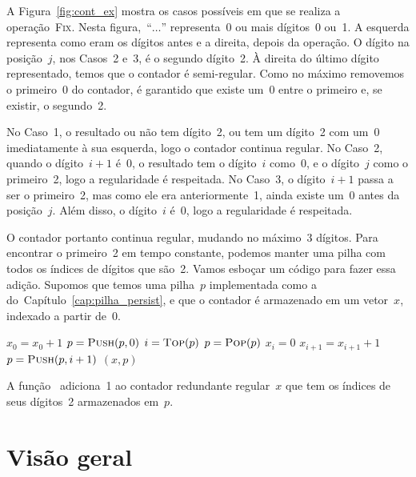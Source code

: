 \documentclass[main.tex]{subfiles}
\begin{document}
A Figura~\ref{fig:cont_ex} mostra os casos possíveis em que se realiza a operação~\textsc{Fix}. Nesta figura,~``$\ldots$'' representa~0 ou mais dígitos~0 ou~1. A esquerda representa como eram os dígitos antes e a direita, depois da operação. O dígito na posição~$j$, nos Casos~2 e~3, é o segundo dígito~2. À direita do último dígito representado, temos que o contador é semi-regular. Como no máximo removemos o primeiro~0 do contador, é garantido que existe um~0 entre o primeiro e, se existir, o segundo~2.

No Caso~1, o resultado ou não tem dígito~2, ou tem um dígito~2 com um~0 imediatamente à sua esquerda, logo o contador continua regular. No Caso~2, quando o dígito~$i + 1$ é~0, o resultado tem o dígito~$i$ como~0, e o dígito~$j$ como o primeiro~2, logo a regularidade é respeitada. No Caso~3, o dígito~$i+1$ passa a ser o primeiro~2, mas como ele era anteriormente~1, ainda existe um~0 antes da posição~$j$. Além disso, o dígito~$i$ é~0, logo a regularidade é respeitada.

O contador portanto continua regular, mudando no máximo~3 dígitos. Para encontrar o primeiro~2 em tempo constante, podemos manter uma pilha com todos os índices de dígitos que são~2. Vamos esboçar um código para fazer essa adição. Supomos que temos uma pilha~$p$ implementada como a do~Capítulo~\ref{cap:pilha_persist}, e que o contador é armazenado em um vetor~$x$, indexado a partir de~0.

\begin{algorithm}
\begin{algorithmic}[1]

    \State $x_0 = x_0 + 1$
        \State $p = \Call{Push}{p, 0}$
    \EndIf
     
        \State $i = \Call{Top}{p}$
        \State $p = \Call{Pop}{p}$
        \State $x_i = 0$
        \State $x_{i+1} = x_{i+1} + 1$
            \State $p = \Call{Push}{p, i + 1}$
        \EndIf
    \EndIf
    \State \Return $(x, p)$
\EndFunction

\end{algorithmic}
\end{algorithm}

A função~ adiciona~1 ao contador redundante regular~$x$ que tem os índices de seus dígitos~2 armazenados em~$p$.

\section{Visão geral}
\end{document}
